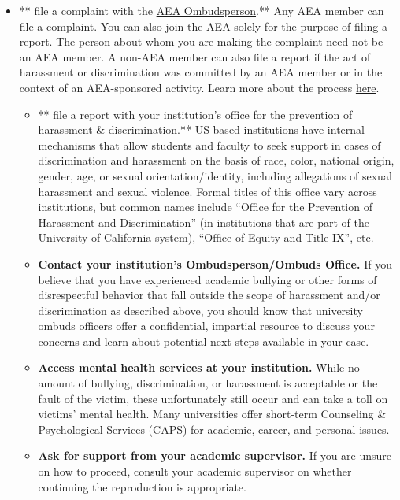 \documentclass[
]{book}
\providecommand{\tightlist}{%
  \setlength{\itemsep}{0pt}\setlength{\parskip}{0pt}}
\begin{document}
\begin{itemize}
\tightlist
\item
  ** file a complaint with the \href{https://www.aeaweb.org/about-aea/aea-ombudsperson}{AEA Ombudsperson}.** Any AEA member can file a complaint. You can also join the AEA solely for the purpose of filing a report. The person about whom you are making the complaint need not be an AEA member. A non-AEA member can also file a report if the act of harassment or discrimination was committed by an AEA member or in the context of an AEA-sponsored activity. Learn more about the process \href{https://www.aeaweb.org/about-aea/aea-ombudsperson/faq}{here}.

  \begin{itemize}
  \tightlist
  \item
    ** file a report with your institution's office for the prevention of harassment \& discrimination.** US-based institutions have internal mechanisms that allow students and faculty to seek support in cases of discrimination and harassment on the basis of race, color, national origin, gender, age, or sexual orientation/identity, including allegations of sexual harassment and sexual violence. Formal titles of this office vary across institutions, but common names include ``Office for the Prevention of Harassment and Discrimination'' (in institutions that are part of the University of California system), ``Office of Equity and Title IX'', etc.
  \item
    \textbf{Contact your institution's Ombudsperson/Ombuds Office.} If you believe that you have experienced academic bullying or other forms of disrespectful behavior that fall outside the scope of harassment and/or discrimination as described above, you should know that university ombuds officers offer a confidential, impartial resource to discuss your concerns and learn about potential next steps available in your case.
  \item
    \textbf{Access mental health services at your institution.} While no amount of bullying, discrimination, or harassment is acceptable or the fault of the victim, these unfortunately still occur and can take a toll on victims' mental health. Many universities offer short-term Counseling \& Psychological Services (CAPS) for academic, career, and personal issues.
  \item
    \textbf{Ask for support from your academic supervisor.} If you are unsure on how to proceed, consult your academic supervisor on whether continuing the reproduction is appropriate.
  \end{itemize}
\end{itemize}
\end{document}
